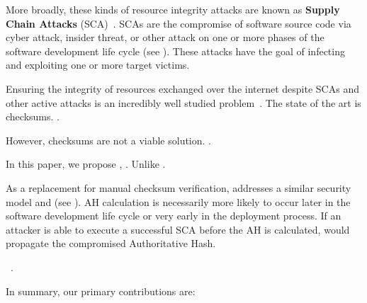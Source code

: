 More broadly, these kinds of resource integrity attacks are known as
\textbf{Supply Chain Attacks} (SCA)~\cite{}. SCAs are the compromise of software
source code via cyber attack, insider threat, or other attack on one or more
phases of the software development life cycle (see ). These
attacks have the goal of infecting and exploiting one or more target victims.

Ensuring the integrity of resources exchanged over the internet despite SCAs and
other active attacks is an incredibly well studied problem~\cite{MD5Header,
HTTP1.1, HTTPS, SRI, LF, OpenPGP1, DNSSEC}. The state of the art is checksums.
.

However, checksums are not a viable solution. .

In this paper, we propose \SYSTEM{}, . Unlike .

As a replacement for manual checksum verification, \SYSTEM{} addresses a similar
security model and   (see ). AH calculation is necessarily more
likely to occur later in the software development life cycle or very early in
the deployment process. If an attacker is able to execute a successful SCA
before the AH is calculated, \SYSTEM{} would propagate the compromised
Authoritative Hash.

~\cite{DNSSEC}.


In summary, our primary contributions are:


